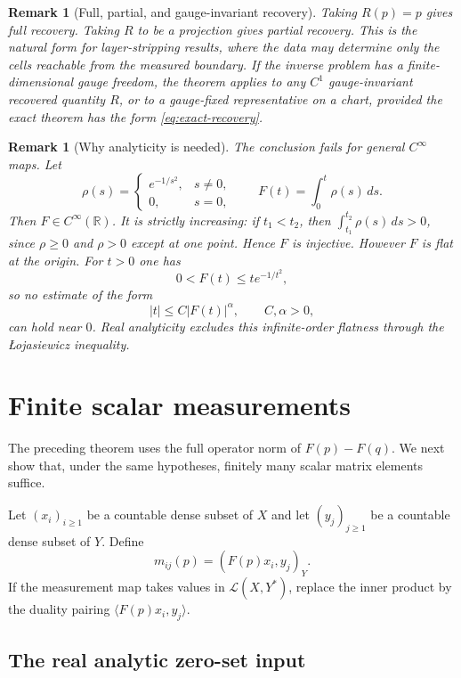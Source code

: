 \documentclass[12pt,oneside]{amsart}
\newtheorem{remark}[theorem]{Remark}
\newcommand{\R}{\mathbb R}
\newcommand{\cL}{\mathcal L}
\newcommand{\dual}[2]{\langle #1,#2\rangle}
\begin{document}
\begin{remark}[Full, partial, and gauge-invariant recovery]\label{rem:partial-recovery}
Taking $R(p)=p$ gives full recovery.  Taking $R$ to be a projection gives partial recovery.  This is the natural form for layer-stripping results, where the data may determine only the cells reachable from the measured boundary.  If the inverse problem has a finite-dimensional gauge freedom, the theorem applies to any $C^1$ gauge-invariant recovered quantity $R$, or to a gauge-fixed representative on a chart, provided the exact theorem has the form \eqref{eq:exact-recovery}.
\end{remark}

\begin{remark}[Why analyticity is needed]\label{rem:smooth-counterexample}
The conclusion fails for general $C^\infty$ maps.  Let
\[
        \rho(s)=
        \begin{cases}
        e^{-1/s^2},& s\ne0,\\
        0,& s=0,
        \end{cases}
        \qquad
        F(t)=\int_0^t \rho(s)\,ds .
\]
Then $F\in C^\infty(\R)$.  It is strictly increasing: if $t_1<t_2$, then $\int_{t_1}^{t_2}\rho(s)\,ds>0$, since $\rho\ge0$ and $\rho>0$ except at one point.  Hence $F$ is injective.  However $F$ is flat at the origin.  For $t>0$ one has
\[
        0<F(t)\le t e^{-1/t^2},
\]
so no estimate of the form
\[
        |t|\le C|F(t)|^\alpha,
        \qquad C,\alpha>0,
\]
can hold near $0$.  Real analyticity excludes this infinite-order flatness through the \L{}ojasiewicz inequality.
\end{remark}

\section{Finite scalar measurements}\label{sec:finite-measurements}

The preceding theorem uses the full operator norm of \(F(p)-F(q)\).  We next show that, under the same hypotheses, finitely many scalar matrix elements suffice.

Let $(x_i)_{i\ge1}$ be a countable dense subset of $X$ and let $(y_j)_{j\ge1}$ be a countable dense subset of $Y$.  Define
\[
        m_{ij}(p)=(F(p)x_i,y_j)_Y .
\]
If the measurement map takes values in $\cL(X,Y^*)$, replace the inner product by the duality pairing $\dual{F(p)x_i}{y_j}$.


\subsection{The real analytic zero-set input}
\end{document}
